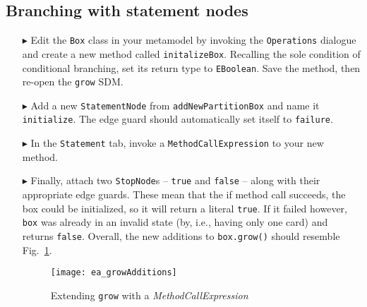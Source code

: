 \clearpage
\hypertarget{conBran vis}{}
\subsection{Branching with statement nodes}
\visHeader

\begin{itemize}
  
\item[$\blacktriangleright$] Edit the \texttt{Box} class in your metamodel by invoking the \texttt{Operations} dialogue and create a new method called
\texttt{initalizeBox}. Recalling the sole condition of conditional branching, set its return type to \texttt{EBoolean}. Save the method, then re-open the
\texttt{grow} SDM.

\vspace{0.5cm}

\item[$\blacktriangleright$] Add a new \texttt{StatementNode} from \texttt{addNewPartitionBox} and name it \texttt{initialize}. The edge guard should
automatically set itself to \texttt{failure}.

\vspace{0.5cm}

\item[$\blacktriangleright$] In the \texttt{Statement} tab, invoke a \texttt{MethodCallExpression} to your new method.

\vspace{0.5cm}

\item[$\blacktriangleright$] Finally, attach two \texttt{StopNode}s -- \texttt{true} and \texttt{false} -- along with their appropriate edge guards. These mean
that the if method call succeeds, the box could be initialized, so it will return a literal \texttt{true}. If it failed however, \texttt{box} was already in an
invalid state (by, i.e., having only one card) and returns \texttt{false}. Overall, the new additions to \texttt{box.grow()} should resemble
Fig.~\ref{fig:newGrowControl}.

\vspace{0.5cm}

\begin{figure}[htp]
\begin{center}
  \texttt{[image: ea\_growAdditions]}
  \caption{Extending \texttt{grow} with a \emph{MethodCallExpression}}
  \label{fig:newGrowControl}
\end{center}
\end{figure}


\end{itemize}
